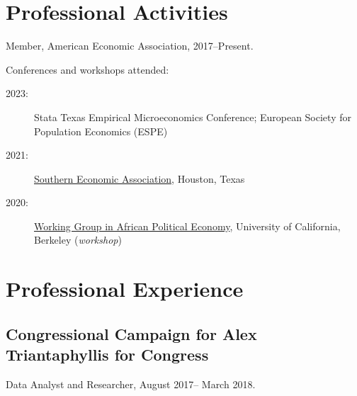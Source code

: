 \documentclass[10pt,letterpaper]{article}
\renewenvironment{itemize}{
  \begin{list}{}{
    \setlength{\leftmargin}{1.5em}
  }
}{
  \end{list}
}
\begin{document}
\section*{Professional Activities}
%
\begin{itemize}
%
\item Member, American Economic Association, 2017--Present.
%
%
%
\item Conferences and workshops attended:
%
\begin{description}

\item[2023:] Stata Texas Empirical Microeconomics Conference; European Society for Population Economics (ESPE) %
\item[2021:] \href{https://www.southerneconomic.org/session-details/?conferenceId=7&eventId=3353}%
{Southern Economic Association}, Houston, Texas
  \item[2020:] \href{https://cega.berkeley.edu/initiative/working-group-in-african-political-economy/}%
{Working Group in African Political Economy}, University of  California, Berkeley (\textit{workshop})
\end{description}
%
\end{itemize}
%
\section*{Professional Experience}
\subsection*{Congressional Campaign for Alex Triantaphyllis for Congress}
\begin{itemize}
\item Data Analyst and Researcher, August 2017-- March 2018.
\end{itemize}
\end{document}
